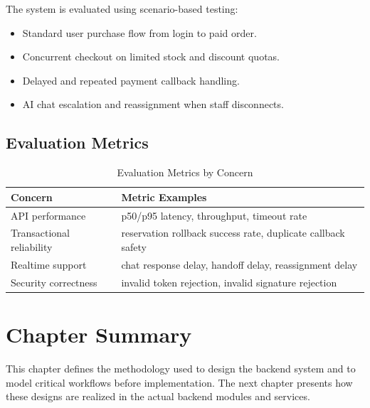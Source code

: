 The system is evaluated using scenario-based testing:
\begin{itemize}
    \item Standard user purchase flow from login to paid order.
    \item Concurrent checkout on limited stock and discount quotas.
    \item Delayed and repeated payment callback handling.
    \item AI chat escalation and reassignment when staff disconnects.
\end{itemize}

\subsection{Evaluation Metrics}

\begin{table}[H]
\centering
\caption{Evaluation Metrics by Concern}
\label{tab:method-evaluation-metrics}
\begin{tabular}{|p{2.8cm}|p{8.6cm}|}
\hline
\textbf{Concern} & \textbf{Metric Examples} \\
\hline
API performance & p50/p95 latency, throughput, timeout rate \\
\hline
Transactional reliability & reservation rollback success rate, duplicate callback safety \\
\hline
Realtime support & chat response delay, handoff delay, reassignment delay \\
\hline
Security correctness & invalid token rejection, invalid signature rejection \\
\hline
\end{tabular}
\end{table}

\section{Chapter Summary}

This chapter defines the methodology used to design the backend system and to model critical workflows before implementation. The next chapter presents how these designs are realized in the actual backend modules and services.
